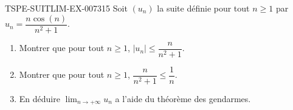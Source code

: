\begin{exercice}{TSPE-SUITLIM-EX-007}{3}{15}
Soit $(u_n)$ la suite définie pour tout $n \geq 1$ par $u_n = \dfrac{n\cos(n)}{n^2 + 1}$.
\begin{enumerate}
  \item Montrer que pour tout $n \geq 1$, $|u_n| \leq \dfrac{n}{n^2 + 1}$.
  \item Montrer que pour tout $n \geq 1$, $\dfrac{n}{n^2 + 1} \leq \dfrac{1}{n}$.
  \item En déduire $\lim_{n \to +\infty} u_n$ a l'aide du théorème des gendarmes.
\end{enumerate}
\end{exercice}
